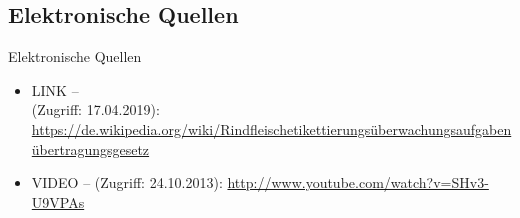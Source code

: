 %
%
%
%
%
%
%
%
%
%
%
%
%
%
%
%
%
%
\subsection*{Elektronische Quellen}

\begin{frame}[allowframebreaks]{Elektronische Quellen}

\footnotesize

\begin{itemize}
	
	\item LINK -- \\
	(Zugriff: 17.04.2019):
	\url{https://de.wikipedia.org/wiki/Rindfleischetikettierungsüberwachungsaufgabenübertragungsgesetz}
	
	\item VIDEO --  (Zugriff: 24.10.2013): \url{http://www.youtube.com/watch?v=SHv3-U9VPAs}
	
\end{itemize}

\end{frame}



